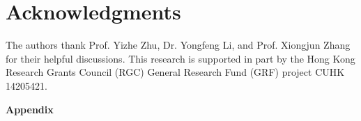 \documentclass{article}
\theoremstyle{plain}
\theoremstyle{definition}
\theoremstyle{remark}
\begin{document}
\section{Acknowledgments}
The authors thank Prof. Yizhe Zhu, Dr. Yongfeng Li, and Prof. Xiongjun Zhang for their helpful discussions. This research is supported in part by the Hong Kong Research Grants Council (RGC) General Research Fund (GRF) project CUHK 14205421.




 
\onecolumn
\begin{appendix}
	\begin{center}
		{\Large \bf Appendix\\ }
  	\vspace{0.4cm}

\end{center}
\end{appendix}
\end{document}
